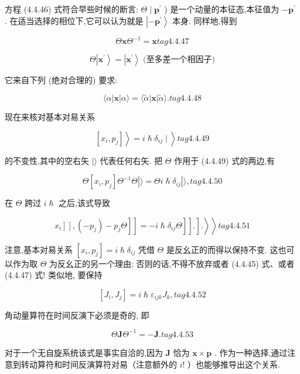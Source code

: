 方程 (4.4.46) 式符合早些时候的断言: $\Theta \mid {\mathbf{p}}^{\prime }$ ) 是一个动量的本征态,本征值为 $- {\mathbf{p}}^{\prime }$ . 在适当选择的相位下,它可以认为就是 $\left| {-{\mathbf{p}}^{\prime }}\right\rangle$ 本身. 同样地,得到

$$
\Theta \mathbf{x}{\Theta }^{-1} = \mathbf{x} tag{4.4.47}
$$

$$
\Theta \left| {\mathbf{x}}^{\prime }\right\rangle = \left| {\mathbf{x}}^{\prime }\right\rangle \;\text{(至多差一个相因子)}
$$

它来自下列 (绝对合理的) 要求:

$$
\langle \alpha \left| \mathbf{x}\right| \alpha \rangle = \langle \widetilde{\alpha }\left| \mathbf{x}\right| \widetilde{\alpha }\rangle . tag{4. 4.48}
$$

现在来核对基本对易关系

$$
\left. {\left. \left\lbrack {{x}_{i},{p}_{j}}\right\rbrack \right\rangle = i\hslash {\delta }_{ij} \mid }\right\rangle tag{4.4.49}
$$

的不变性,其中的空右矢 $|\rangle$ 代表任何右矢. 把 $\Theta$ 作用于 (4.4.49) 式的两边,有

$$
\Theta \left\lbrack {{x}_{i},{p}_{j}}\right\rbrack {\Theta }^{-1}\Theta \left| {\rangle = {\Theta i}\hslash {\delta }_{ij}}\right| \rangle , tag{4. 4.50}
$$

在 $\Theta$ 跨过 $i\hslash$ 之后,该式导致

$$
\left. \left. {\left. {\left. \left. {\left. \left. {\left. \left. {x}_{i}\right\rbrack \right\rbrack ,\left( {-{p}_{j}}\right) - {p}_{j}\Theta }\right\rbrack \right\rbrack = - i\hslash {\delta }_{ij}\Theta }\right\rbrack \right\rbrack .}\right\rbrack .}\right\rangle \right\rangle tag{4. 4.51}
$$

注意,基本对易关系 $\left\lbrack {{x}_{i},{p}_{j}}\right\rbrack = i\hslash {\delta }_{ij}$ 凭借 $\Theta$ 是反幺正的而得以保持不变. 这也可以作为取 $\Theta$ 为反幺正的另一个理由; 否则的话,不得不放弃或者 (4.4.45) 式、或者 (4.4.47) 式! 类似地, 要保持

$$
\left\lbrack {{J}_{i},{J}_{j}}\right\rbrack = i\hslash {\varepsilon }_{ijk}{J}_{k}, tag{4. 4.52}
$$

角动量算符在时间反演下必须是奇的, 即

$$
\Theta \mathbf{J}{\Theta }^{-1} = - \mathbf{J}. tag{4. 4.53}
$$

对于一个无自旋系统该式是事实自洽的,因为 $\mathbf{J}$ 恰为 $\mathbf{x} \times \mathbf{p}$ . 作为一种选择,通过注意到转动算符和时间反演算符对易（注意额外的 $i!$ ）也能够推导出这个关系.


\ifx\allfiles\undefined

	\else
	\fi
